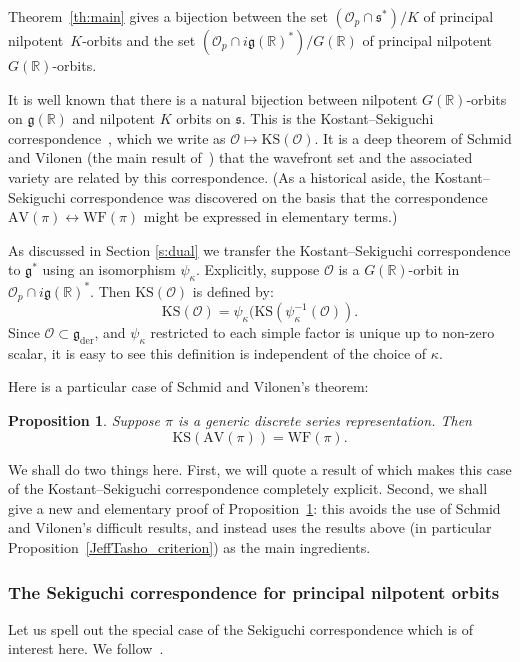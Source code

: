 \documentclass[10pt,leqno]{article}
\newtheorem{proposition}[equation]{Proposition}
\numberwithin{equation}{section}
\renewcommand{\O}{\mathcal O}
\newcommand{\R}{\mathbb R}
\newcommand{\g}{\mathfrak g}
\newcommand{\gder}{\mathfrak g_{\mathrm{der}}}
\newcommand\inv{^{-1}}
\newcommand{\s}{\mathfrak s}
\newcommand{\AV}{\mathrm{AV}}
\newcommand{\KS}{\mathrm{KS}}
\newcommand{\WF}{\mathrm{WF}}
\newcommand{\Op}{\O_p}
\begin{document}
Theorem~\ref{th:main} gives a bijection between the set $(\Op \cap \s^*)/K$ of principal nilpotent~$K$-orbits and the set $(\Op \cap i\g(\R)^*)/G(\R)$ of principal nilpotent~$G(\R)$-orbits. 

It is well known that there is a natural bijection between nilpotent $G(\R)$-orbits on $\g(\R)$ and nilpotent $K$ orbits on $\s$. 
This is the Kostant--Sekiguchi
correspondence~\cite{sekiguchi}, which we write as $\O \mapsto \KS(\O)$. It is a deep theorem of
Schmid and Vilonen (the main result of~\cite{SV1}) that the wavefront
set and the associated variety are related by this
correspondence. (As a historical aside, the Kostant--Sekiguchi
correspondence was discovered on the basis that the correspondence
$\AV(\pi) \leftrightarrow \WF(\pi)$ might be expressed in elementary
terms.)

As discussed in Section \ref{s:dual} we transfer the Kostant--Sekiguchi correspondence to $\g^*$ using  an isomorphism $\psi_\kappa$.
Explicitly, suppose $\O$ is a $G(\R)$-orbit in $\O_p\cap i\g(\R)^*$.  Then $\KS(\O)$ is defined by:
$$
\KS(\O)=\psi_\kappa(\KS(\psi_\kappa\inv(\O)).
$$
Since $\O\subset \gder$, and $\psi_\kappa$ restricted to each simple factor is unique up to non-zero scalar, it is easy to see this definition
is independent of the choice of $\kappa$. 

Here is a particular case of Schmid and Vilonen's theorem:

\begin{proposition} \label{Sekiguchi_result}
Suppose $\pi$ is a generic discrete series representation. Then
$$
\KS(\AV(\pi))=\WF(\pi).
$$
\end{proposition}

We shall do two things here. First, we will quote a result of \cite{AVAV} which makes this case of the Kostant--Sekiguchi correspondence completely explicit. Second, we shall give a new and elementary proof of Proposition~\ref{Sekiguchi_result}: this avoids the use of Schmid and Vilonen's difficult results, and instead uses the results above (in particular Proposition~\ref{JeffTasho_criterion}) as the main ingredients. 


\subsubsection{The Sekiguchi correspondence for principal nilpotent orbits}\label{sec:concrete_sek}
Let us spell out the special case of the Sekiguchi correspondence which is of interest here. We follow~\cite[Section~2]{AVAV}.
\end{document}
